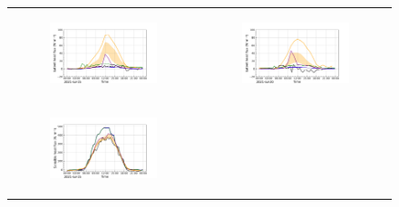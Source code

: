 \begin{figure}[hbtp]
    \centering
    \begin{tabular}{cc}
        \begin{subfigure}[t]{0.5\textwidth}
            \caption{}
            \includegraphics[width=\textwidth]{images/chap5/IOP_TS/TS_2021-07-15_elsplans_flat.png}
        \end{subfigure} &
        \begin{subfigure}[t]{0.5\textwidth}
            \caption{}
            \includegraphics[width=\textwidth]{images/chap5/IOP_TS/TS_2021-07-20_elsplans_flat.png}
        \end{subfigure} \\
        \begin{subfigure}[t]{0.5\textwidth}
            \caption{}
            \includegraphics[width=\textwidth]{images/chap5/IOP_TS/TS_2021-07-15_elsplans_sens.png}

\end{subfigure}
\end{tabular}
\end{figure}
